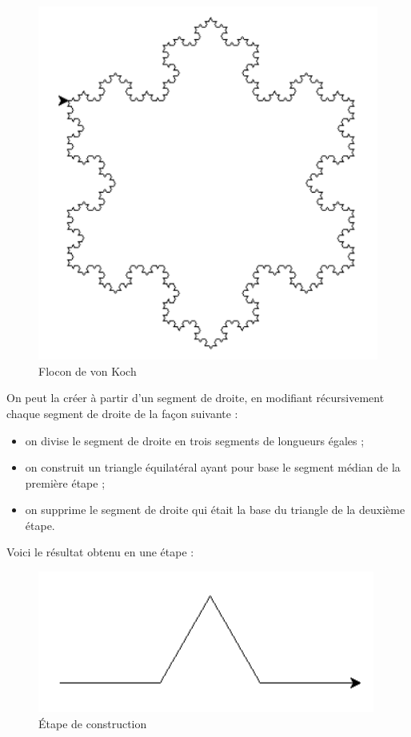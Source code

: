 \documentclass[
  letterpaper,
  DIV=11,
  numbers=noendperiod]{scrartcl}
\providecommand{\tightlist}{%
  \setlength{\itemsep}{0pt}\setlength{\parskip}{0pt}}\usepackage{longtable,booktabs,array}
\begin{document}
\begin{figure}

{\centering \includegraphics{koch.png}

}

\caption{Flocon de von Koch}

\end{figure}

On peut la créer à partir d'un segment de droite, en modifiant
récursivement chaque segment de droite de la façon suivante :

\begin{itemize}
\tightlist
\item
  on divise le segment de droite en trois segments de longueurs égales ;
\item
  on construit un triangle équilatéral ayant pour base le segment médian
  de la première étape ;
\item
  on supprime le segment de droite qui était la base du triangle de la
  deuxième étape.
\end{itemize}

Voici le résultat obtenu en une étape :

\begin{figure}

{\centering \includegraphics{koch_etape.png}

}

\caption{Étape de construction}

\end{figure}
\end{document}
